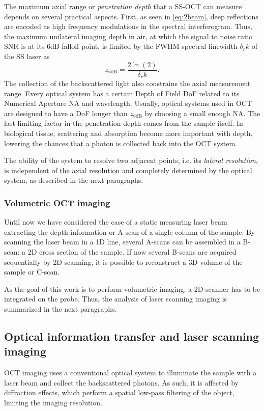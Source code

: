 The maximum axial range or \textit{penetration depth} that a SS-OCT can measure depends on several practical aspects. First, as seen in \autoref{eq:2beam}, deep reflections are encoded as high frequency modulations in the spectral interferogram. Thus, the maximum unilateral imaging depth in air, at which the signal to noise ratio SNR is at its 6dB falloff point, is limited by the FWHM spectral linewidth $\delta_r k$ of the SS laser \cite{Drexler2008} as
\begin{equation}
z_\textrm{6dB} = \frac{2 \ln{(2)}}{\delta_r k}.
\end{equation}
The collection of the backscattered light also constrains the axial measurement range. Every optical system has a certain Depth of Field DoF related to its Numerical Aperture NA and wavelength. Usually, optical systems used in OCT are designed to have a DoF longer than $z_\textrm{6dB}$ by choosing a small enough NA.
The last limiting factor in the penetration depth comes from the sample itself. In biological tissue, scattering and absorption become more important with depth, lowering the chances that a photon is collected back into the OCT system.

The ability of the system to resolve two adjacent points, i.e. its \textit{lateral resolution}, is independent of the axial resolution and completely determined by the optical system, as described in the next paragraphs. 

\subsubsection{Volumetric OCT imaging}
Until now we have considered the case of a static measuring laser beam extracting the depth information or A-scan of a single column of the sample. By scanning the laser beam in a 1D line, several A-scans can be assembled in a B-scan: a 2D cross section of the sample. If now several B-scans are acquired sequentially by 2D scanning, it is possible to reconstruct a 3D volume of the sample or C-scan.

As the goal of this work is to perform volumetric imaging, a 2D scanner has to be integrated on the probe. Thus, the analysis of laser scanning imaging is summarized in the next paragraphs.


\subsection{Optical information transfer and laser scanning imaging}
OCT imaging uses a conventional optical system to illuminate the sample with a laser beam and collect the backscattered photons. As such, it is affected by diffraction effects, which perform a spatial low-pass filtering of the object, limiting the imaging resolution. 

